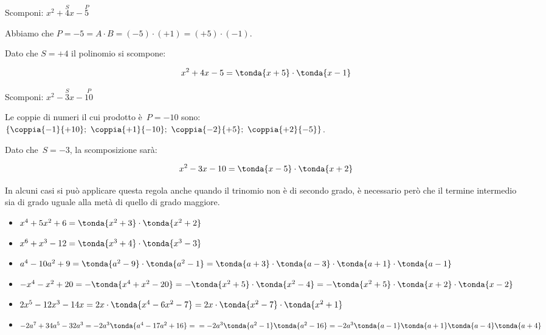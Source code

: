 
\begin{esempio}{}{}
Scomponi: \(x^2+\overset{S}{4}x-\overset{P}{5}\)

Abbiamo che \(P = -5 = A \cdot B = (-5) \cdot (+1) = (+5) \cdot (-1)\).

Dato che \(S = +4\) il polinomio si scompone:

\vspace{-1.0em}
\[x^2+4x-5=\tonda{x+5}\cdot \tonda{x-1}\]
\end{esempio}

\begin{esempio}{}{}
Scomponi: \(x^2-\overset{S}{3}x-\overset{P}{10}\)

Le coppie di numeri il cui prodotto è~\(P=-10\) sono:\\ 
\(\{\coppia{-1}{+10};~\coppia{+1}{-10};~\coppia{-2}{+5};~\coppia{+2}{-5}\}\).

Dato che~\(S=-3\), la scomposizione sarà:

\vspace{-1.0em}
\[x^2-3x-10=\tonda{x-5}\cdot \tonda{x+2}\]
\end{esempio}

\begin{esempio}{}{}
In alcuni casi si può applicare questa regola anche quando il trinomio
non è di secondo grado, è necessario però che il termine 
intermedio sia di grado uguale alla metà di quello di grado maggiore.

\begin{itemize}[nosep]
\item \(x^4+5x^2+6=\tonda{x^2+3}\cdot \tonda{x^2+2}\)
\item \(x^6+x^3-12=\tonda{x^3+4}\cdot \tonda{x^3-3}\)
\item \(a^{4}-10a^{2}+9=\tonda{a^{2}-9}\cdot\tonda{a^{2}-1}=
       \tonda{a+3}\cdot \tonda{a-3}\cdot 
       \tonda{a+1}\cdot\tonda{a-1}\)
\item \(-x^4-x^2+20=-\tonda{x^4+x^2-20}=
       -\tonda{x^2+5}\cdot\tonda{x^2-4}=
       -\tonda{x^2+5}\cdot\tonda{x+2}\cdot \tonda{x-2}\)
\item \(2x^{5}-12x^3-14x=2x\cdot \tonda{x^4-6x^2-7}=2x\cdot%
\tonda{x^2-7}\cdot \tonda{x^2+1}\)
\item \(-2a^{7}+34a^{5}-32a^{3}=-2a^{3}\tonda{a^{4}-17a^{2}+16}=\\
    =-2a^{3}\tonda{a^{2}-1}\tonda{a^{2}-16}
=-2a^{3}\tonda{a-1}\tonda{a+1}\tonda{a-4}\tonda{a+4}\)
\end{itemize}
\end{esempio}


